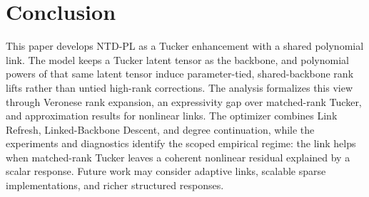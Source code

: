 \section{Conclusion}

This paper develops NTD-PL as a Tucker enhancement with a shared polynomial
link. The model keeps a Tucker latent tensor as the backbone, and polynomial
powers of that same latent tensor induce parameter-tied, shared-backbone rank
lifts rather than untied high-rank corrections. The analysis formalizes this
view through Veronese rank expansion, an expressivity gap over matched-rank
Tucker, and approximation results for nonlinear links. The optimizer combines
Link Refresh, Linked-Backbone Descent, and degree continuation, while the
experiments and diagnostics identify the scoped empirical regime: the link
helps when matched-rank Tucker leaves a coherent nonlinear residual explained
by a scalar response. Future work may consider adaptive links, scalable sparse
implementations, and richer structured responses.
